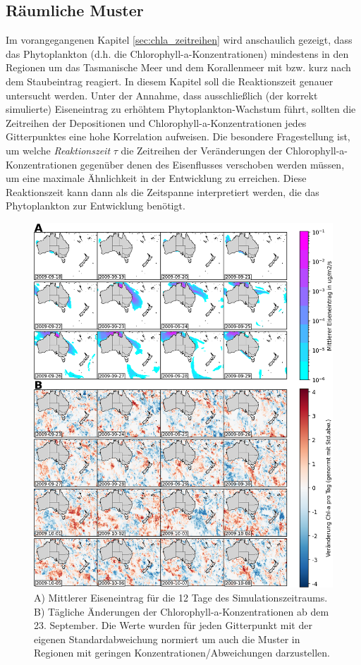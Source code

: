 \documentclass[12pt,a4paper,onecolumn]{scrartcl}
\begin{document}
\subsection{Räumliche Muster} \label{sec:auswertung_räuml_Muster}
Im vorangegangenen Kapitel \ref{sec:chla_zeitreihen} wird anschaulich gezeigt, dass das Phytoplankton (d.h. die Chlorophyll-a-Konzentrationen) mindestens in den Regionen um das Tasmanische Meer und dem Korallenmeer mit bzw. kurz nach dem Staubeintrag reagiert. In diesem Kapitel soll die Reaktionszeit genauer untersucht werden. Unter der Annahme, dass ausschließlich (der korrekt simulierte) Eiseneintrag zu erhöhtem Phytoplankton-Wachstum führt, sollten die Zeitreihen der Depositionen und Chlorophyll-a-Konzentrationen jedes Gitterpunktes eine hohe Korrelation aufweisen. Die besondere Fragestellung ist, um welche \textit{Reaktionszeit} $\tau$ die Zeitreihen der Veränderungen der Chlorophyll-a-Konzentrationen gegenüber denen des Eisenflusses verschoben werden müssen, um eine maximale Ähnlichkeit in der Entwicklung zu erreichen. Diese Reaktionszeit kann dann als die Zeitspanne interpretiert werden, die das Phytoplankton zur Entwicklung benötigt.
\begin{figure}
\includegraphics[width=\textwidth]{bilder/snapshot_normalized.png}
\caption{A) Mittlerer Eiseneintrag für die 12 Tage des Simulationszeitraums. B) Tägliche Änderungen der Chlorophyll-a-Konzentrationen ab dem 23. September. Die Werte wurden für jeden Gitterpunkt mit der eigenen Standardabweichung normiert um auch die Muster in Regionen mit geringen Konzentrationen/Abweichungen darzustellen.} \label{fig:snapshot_fedep_chla}
\end{figure}
\end{document}
